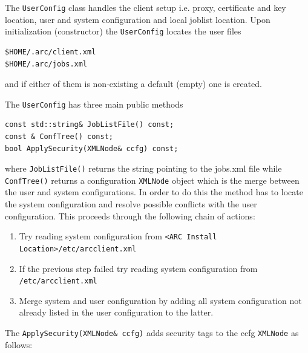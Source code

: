 \documentclass{book}
\newcommand{\UserConfig}{\texttt{UserConfig}}
\newcommand{\XMLNode}{\texttt{XMLNode}}
\begin{document}
The {\UserConfig} class handles the client setup i.e. proxy,
certificate and key location, user and system configuration and local
joblist location. Upon initialization (constructor) the {\UserConfig}
locates the user files

\begin{shaded}
\begin{verbatim}
$HOME/.arc/client.xml
$HOME/.arc/jobs.xml
\end{verbatim}
\end{shaded}

and if either of them is non-existing a default (empty) one is created.

The {\UserConfig} has three main public methods

\begin{shaded}
\begin{verbatim}
const std::string& JobListFile() const;
const & ConfTree() const;
bool ApplySecurity(XMLNode& ccfg) const;
\end{verbatim}
\end{shaded}

where \texttt{JobListFile()} returns the string pointing to the
jobs.xml file while \texttt{ConfTree()} returns a configuration
{\XMLNode} object which is the merge between the user and system
configurations. In order to do this the method has to locate the
system configuration and resolve possible conflicts with the user
configuration. This proceeds through the following chain of actions:

\begin{enumerate}
\item{Try reading system configuration from \texttt{<ARC Install
    Location>/etc/arcclient.xml}}
\item{If the previous step failed try reading system configuration
  from \texttt{/etc/arcclient.xml}}
\item{Merge system and user configuration by adding all system
  configuration not already listed in the user configuration to the
  latter.}
\end{enumerate}

The \texttt{ApplySecurity(XMLNode\& ccfg)} adds security tags to the
ccfg {\XMLNode} as follows:
\end{document}
